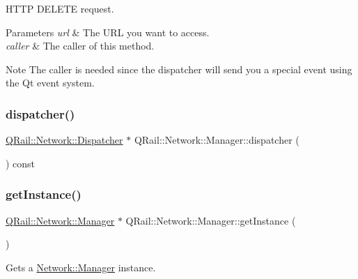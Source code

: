 H\+T\+TP D\+E\+L\+E\+TE request. 


\begin{DoxyParams}{Parameters}
{\em url} & The U\+RL you want to access. \\
\hline
{\em caller} & The caller of this method. \\
\hline
\end{DoxyParams}
\begin{DoxyNote}{Note}
The caller is needed since the dispatcher will send you a special event using the Qt event system. 
\end{DoxyNote}
\mbox{\label{classQRail_1_1Network_1_1Manager_a21b6ceec7b0c085ffc74a9a2ced44688}} 
\subsubsection{\texorpdfstring{dispatcher()}{dispatcher()}}
{\footnotesize\ttfamily \mbox{\hyperlink{classQRail_1_1Network_1_1Dispatcher}{Q\+Rail\+::\+Network\+::\+Dispatcher}} $\ast$ Q\+Rail\+::\+Network\+::\+Manager\+::dispatcher (\begin{DoxyParamCaption}{ }\end{DoxyParamCaption}) const}

\mbox{\label{classQRail_1_1Network_1_1Manager_a908536cf83d489afd0480a492f004def}} 
\subsubsection{\texorpdfstring{getInstance()}{getInstance()}}
{\footnotesize\ttfamily \mbox{\hyperlink{classQRail_1_1Network_1_1Manager}{Q\+Rail\+::\+Network\+::\+Manager}} $\ast$ Q\+Rail\+::\+Network\+::\+Manager\+::get\+Instance (\begin{DoxyParamCaption}{ }\end{DoxyParamCaption})\hspace{0.3cm}{\ttfamily [static]}}



Gets a \mbox{\hyperlink{classQRail_1_1Network_1_1Manager}{Network\+::\+Manager}} instance. 

